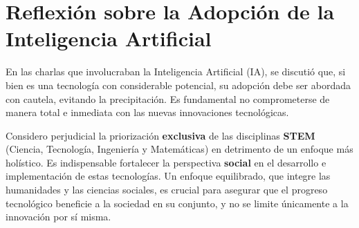 \documentclass{article}
\begin{document}
\section*{Reflexión sobre la Adopción de la Inteligencia Artificial}
En las charlas que involucraban la Inteligencia Artificial (IA), se discutió que, si bien es una tecnología con considerable potencial, su adopción debe ser abordada con cautela, evitando la precipitación. Es fundamental no comprometerse de manera total e inmediata con las nuevas innovaciones tecnológicas.

Considero perjudicial la priorización \textbf{exclusiva} de las disciplinas \textbf{STEM} (Ciencia, Tecnología, Ingeniería y Matemáticas) en detrimento de un enfoque más holístico. Es indispensable fortalecer la perspectiva \textbf{social} en el desarrollo e implementación de estas tecnologías. Un enfoque equilibrado, que integre las humanidades y las ciencias sociales, es crucial para asegurar que el progreso tecnológico beneficie a la sociedad en su conjunto, y no se limite únicamente a la innovación por sí misma.
\end{document}

